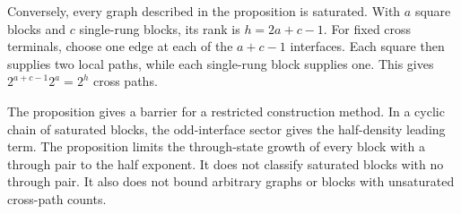 Conversely, every graph described in the proposition is saturated.
With $a$ square blocks and $c$ single-rung blocks, its rank is $h=2a+c-1$.
For fixed cross terminals, choose one edge at each of the $a+c-1$ interfaces.
Each square then supplies two local paths, while each single-rung block supplies one.
This gives $2^{a+c-1}2^a=2^h$ cross paths.

The proposition gives a barrier for a restricted construction method.
In a cyclic chain of saturated blocks, the odd-interface sector gives the half-density leading term.
The proposition limits the through-state growth of every block with a through pair to the half exponent.
It does not classify saturated blocks with no through pair.
It also does not bound arbitrary graphs or blocks with unsaturated cross-path counts.
